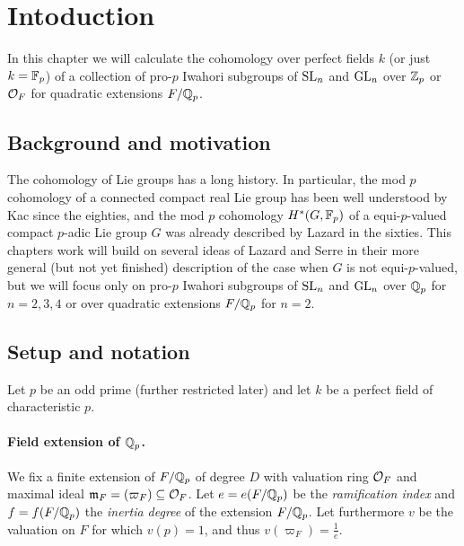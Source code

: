 \section{Intoduction}%
\label{sec:cohiwagps-intro}

In this chapter we will calculate the cohomology over perfect fields $k$ (or just $k = \mathbb{F}_{p}$) of a collection of pro-$p$ Iwahori subgroups of $\operatorname{SL}_{n}$ and $\operatorname{GL}_{n}$ over $\mathbb{Z}_{p}$ or $\mathcal{O}_{F}$ for quadratic extensions $F/\mathbb{Q}_{p}$.

\subsection{Background and motivation}%
\label{subsec:background-iwa}


The cohomology of Lie groups has a long history. In particular, the mod $p$ cohomology of a connected compact real Lie group has been well understood by Kac since the eighties, and the mod $p$ cohomology $H^*(G,\mathbb{F}_p)$ of a equi-$p$-valued compact $p$-adic Lie group $G$ was already described by Lazard in the sixties. This chapters work will build on several ideas of Lazard and Serre in their more general (but not yet finished) description of the case when $G$ is not equi-$p$-valued, but we will focus only on pro-$p$ Iwahori subgroups of $\operatorname{SL}_{n}$ and $\operatorname{GL}_{n}$ over $\mathbb{Q}_{p}$ for $n=2,3,4$ or over quadratic extensions $F/\mathbb{Q}_{p}$ for $n=2$.

\subsection{Setup and notation}%
\label{subsec:setup-iwa}

Let $p$ be an odd prime (further restricted later) and let $k$ be a perfect field of characteristic $p$.

\paragraph{Field extension of $\mathbb{Q}_{p}$.} We fix a finite extension of $F/\mathbb{Q}_{p}$ of degree $D$ with valuation ring $\mathcal{O}_{F}$ and maximal ideal $\mathfrak{m}_{F} = (\varpi_{F}) \subseteq \mathcal{O}_{F}$. Let $e = e(F/\mathbb{Q}_{p})$ be the \emph{ramification index} and $f = f(F/\mathbb{Q}_{p})$ the \emph{inertia degree} of the extension $F/\mathbb{Q}_{p}$. Let furthermore $v$ be the valuation on $F$ for which $v(p) = 1$, and thus $v(\varpi_{F}) = \frac{1}{e}$.

